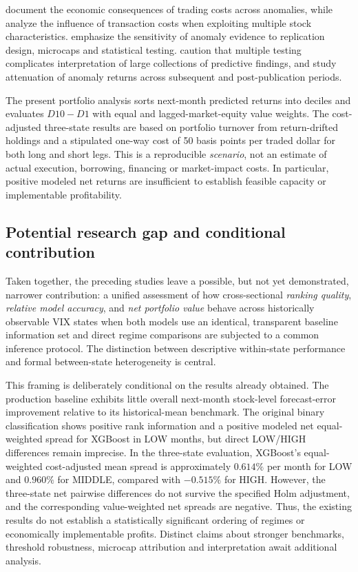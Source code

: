 \cite{NovyMarxVelikov2016} document the economic consequences of trading
costs across anomalies, while \cite{DeMiguelEtAl2020} analyze the influence
of transaction costs when exploiting multiple stock characteristics.
\cite{HouXueZhang2020} emphasize the sensitivity of anomaly evidence
to replication design, microcaps and statistical testing.
\cite{HarveyLiuZhu2016} caution that multiple testing complicates
interpretation of large collections of predictive findings, and
\cite{McLeanPontiff2016} study attenuation of anomaly returns across
subsequent and post-publication periods.

The present portfolio analysis sorts next-month predicted returns into
deciles and evaluates $D10-D1$ with equal and lagged-market-equity value
weights. The cost-adjusted three-state results are based on portfolio
turnover from return-drifted holdings and a stipulated one-way cost of
50 basis points per traded dollar for both long and short legs.
This is a reproducible \emph{scenario}, not an estimate of actual
execution, borrowing, financing or market-impact costs. In particular,
positive modeled net returns are insufficient to establish feasible
capacity or implementable profitability.

\subsection{Potential research gap and conditional contribution}
\label{subsec:literature-gap}

Taken together, the preceding studies leave a possible, but not yet
demonstrated, narrower contribution: a unified assessment of how
cross-sectional \emph{ranking quality}, \emph{relative model accuracy},
and \emph{net portfolio value} behave across historically observable
VIX states when both models use an identical, transparent baseline
information set and direct regime comparisons are subjected to a common
inference protocol. The distinction between descriptive within-state
performance and formal between-state heterogeneity is central.

This framing is deliberately conditional on the results already obtained.
The production baseline exhibits little overall next-month stock-level
forecast-error improvement relative to its historical-mean benchmark.
The original binary classification shows positive rank information and
a positive modeled net equal-weighted spread for XGBoost in LOW months,
but direct LOW/HIGH differences remain imprecise.
In the three-state evaluation, XGBoost's equal-weighted cost-adjusted
mean spread is approximately $0.614\%$ per month for LOW and
$0.960\%$ for MIDDLE, compared with $-0.515\%$ for HIGH.
However, the three-state net pairwise differences do not survive the
specified Holm adjustment, and the corresponding value-weighted net
spreads are negative. Thus, the existing results do not establish a
statistically significant ordering of regimes or economically
implementable profits. Distinct claims about stronger benchmarks,
threshold robustness, microcap attribution and interpretation await
additional analysis.

